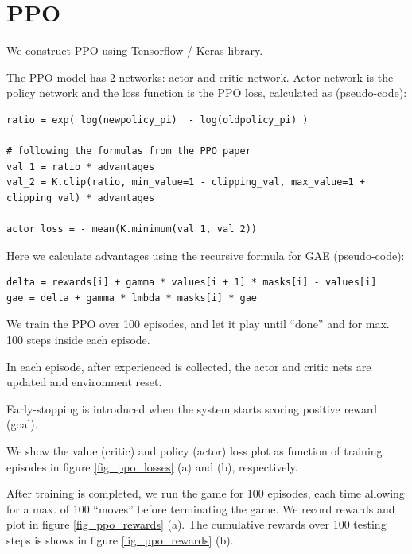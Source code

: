 \section{PPO}\label{PPO}

We construct PPO using Tensorflow / Keras library.

The PPO model has 2 networks: actor and critic network. Actor network is the policy network and the loss function is the PPO loss, calculated as (pseudo-code):
\begin{lstlisting}
ratio = exp( log(newpolicy_pi)  - log(oldpolicy_pi) )

# following the formulas from the PPO paper
val_1 = ratio * advantages
val_2 = K.clip(ratio, min_value=1 - clipping_val, max_value=1 + clipping_val) * advantages

actor_loss = - mean(K.minimum(val_1, val_2))
\end{lstlisting}

Here we calculate advantages using the recursive formula for GAE (pseudo-code):
\begin{lstlisting}
delta = rewards[i] + gamma * values[i + 1] * masks[i] - values[i]
gae = delta + gamma * lmbda * masks[i] * gae
\end{lstlisting}

We train the PPO over 100 episodes, and let it play until ``done'' and for max. 100 steps inside each episode.

In each episode, after experienced is collected, the actor and critic nets are updated and environment reset.

Early-stopping is introduced when the system starts scoring positive reward (goal).

We show the value (critic) and policy (actor) loss plot as function of training episodes in figure \ref{fig_ppo_losses} (a) and (b), respectively.

After training is completed, we run the game for 100 episodes, each time allowing for a max. of 100 ``moves'' before terminating the game. We record rewards and plot in figure \ref{fig_ppo_rewards} (a). The cumulative rewards over 100 testing steps is shows in figure \ref{fig_ppo_rewards} (b). 

